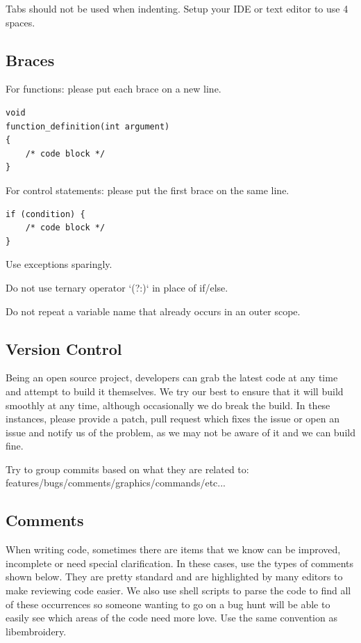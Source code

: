 \documentclass[10pt]{report}
\begin{document}
Tabs should not be used when indenting. Setup your IDE or text editor to use 4 spaces.

\subsection{Braces}

For functions: please put each brace on a new line.

\begin{lstlisting}
void
function_definition(int argument)
{
    /* code block */
}
\end{lstlisting}

For control statements: please put the first brace on the same line.

\begin{lstlisting}
if (condition) {
    /* code block */    
}
\end{lstlisting}

Use exceptions sparingly.

Do not use ternary operator `(?:)` in place of if/else.

Do not repeat a variable name that already occurs in an outer scope.

\subsection{Version Control}

Being an open source project, developers can grab the latest code at any time
and attempt to build it themselves. We try our best to ensure that it will build smoothly
at any time, although occasionally we do break the build. In these instances,
please provide a patch, pull request which fixes the issue or open an issue and
notify us of the problem, as we may not be aware of it and we can build fine.

Try to group commits based on what they are related to: features/bugs/comments/graphics/commands/etc...

\subsection{Comments}

When writing code, sometimes there are items that we know can be improved,
incomplete or need special clarification. In these cases, use the types of
comments shown below. They are pretty standard and are highlighted by many editors to
make reviewing code easier. We also use shell scripts to parse the code to find
all of these occurrences so someone wanting to go on a bug hunt will be able to
easily see which areas of the code need more love. Use the same convention
as libembroidery.
\end{document}
